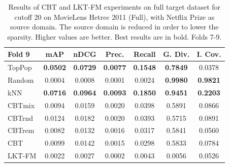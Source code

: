 \begin{table}[hbt]
\begin{tabulary}{\textwidth}{|L|CCCCCC|}
\hline
\hline
Fold 9 & mAP & nDCG & Prec. & Recall & G. Div. & I. Cov. \\
\hline
TopPop & \textbf{0.0502} &\textbf{0.0729} &\textbf{0.0077} &\textbf{0.1548} &\textbf{0.7849} & 0.0378 \\
Random & 0.0004 & 0.0008 & 0.0001 & 0.0024 &\textbf{0.9980} & \textbf{0.9821} \\
kNN & \textbf{0.0716} &\textbf{0.0964} &\textbf{0.0093} &\textbf{0.1850} &\textbf{0.9451} & \textbf{0.2203} \\
CBTmix & 0.0094 & 0.0159 & 0.0020 & 0.0398 & 0.5891 & 0.0866 \\
CBTrnd & 0.0124 & 0.0182 & 0.0020 & 0.0393 & 0.5715 & 0.0891 \\
CBTrem & 0.0082 & 0.0132 & 0.0016 & 0.0317 & 0.5841 & 0.0560 \\
CBT & 0.0099 & 0.0142 & 0.0015 & 0.0298 & 0.5833 & 0.0784 \\
LKT-FM & 0.0022 &           0.0027 &           0.0002 &           0.0043 &                                            0.0056 &                                            0.0526 \\
\hline
\end{tabulary}
\caption{Results of CBT and LKT-FM experiments on full target dataset for cutoff 20 on MovieLens Hetrec 2011 (Full), with Netflix Prize as source domain. The source domain is reduced in order to lower the sparsity. Higher values are better. Best results are in bold. Folds 7-9.}
\end{table}


